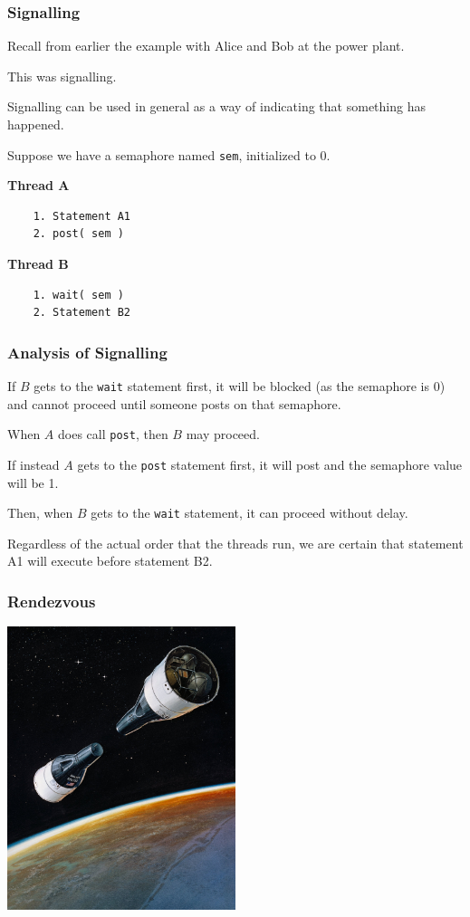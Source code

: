\begin{frame}[fragile]
	\frametitle{Signalling}

	Recall from earlier the example with Alice and Bob at the power plant.

	This was signalling.

	Signalling can be used in general as a way of indicating that something has happened.

	Suppose we have a semaphore named \texttt{sem}, initialized to 0.

	\begin{multicols}{2}
		\textbf{Thread A}
		\begin{verbatim}
	1. Statement A1
	2. post( sem )
  \end{verbatim}
		\columnbreak
		\textbf{Thread B}
		\begin{verbatim}
	1. wait( sem )
	2. Statement B2
  \end{verbatim}
	\end{multicols}
	\vspace{-2em}


\end{frame}

\begin{frame}
	\frametitle{Analysis of Signalling}

	If $B$ gets to the \texttt{wait} statement first, it will be blocked (as the semaphore is 0) and cannot proceed until someone posts on that semaphore.

	When $A$ does call \texttt{post}, then $B$ may proceed.

	If instead $A$ gets to the \texttt{post} statement first, it will post and the semaphore value will be 1.

	Then, when $B$ gets to the \texttt{wait} statement, it can proceed without delay.

	Regardless of the actual order that the threads run, we are certain that statement A1 will execute before statement B2.

\end{frame}


\begin{frame}
	\frametitle{Rendezvous}

	\begin{center}
		\includegraphics[width=0.5\textwidth]{images/nasa-rendezvous.jpg}
	\end{center}


\end{frame}


